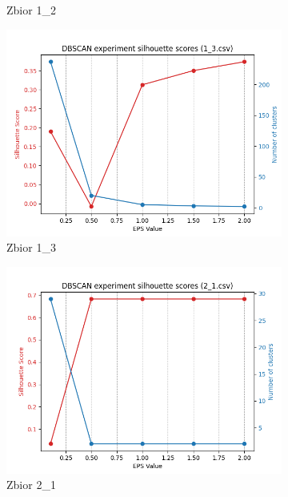 \documentclass[12pt]{article}
\begin{document}
\begin{figure}[H]
\begin{subfigure}[b]{0.3\textwidth}
        \caption{Zbior 1\_2}
    \end{subfigure}
    \hfill
    \begin{subfigure}[b]{0.3\textwidth}
        \includegraphics[width=\linewidth]{img/exp_1/dbscan/1_3_scores.png}
        \caption{Zbior 1\_3}
    \end{subfigure}
    \begin{subfigure}[b]{0.3\textwidth}
        \includegraphics[width=\linewidth]{img/exp_1/dbscan/2_1_scores.png}
        \caption{Zbior 2\_1}
    \end{subfigure}
    \hfill
    \begin{subfigure}[b]{0.3\textwidth}

\end{subfigure}
\end{figure}
\end{document}
